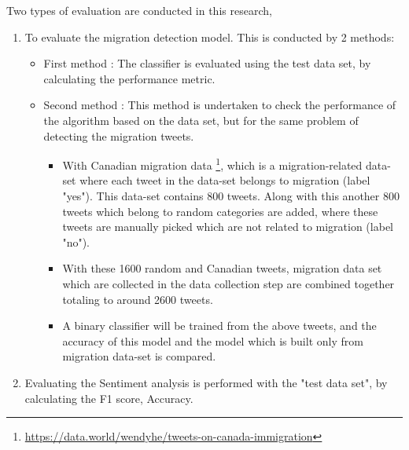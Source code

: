 Two types of evaluation are conducted in this research,
\begin{enumerate}
    \item To evaluate the migration detection model. This is conducted by 2 methods:
    \begin{itemize}
        \item First method : 
        The classifier is evaluated using the test data set, by calculating the performance metric.
        \item Second method :
         This method is undertaken to check the performance of the algorithm based on the data set, but for the same problem of detecting the migration tweets.
        \begin{itemize}
       
            \item With Canadian migration data \footnote{\url{https://data.world/wendyhe/tweets-on-canada-immigration}}, which is a migration-related data-set where each tweet in the data-set belongs to migration (label "yes"). This data-set contains 800 tweets. Along with this another 800 tweets which belong to random categories are added, where these tweets are manually picked which are not related to migration (label "no"). 
            \item With these 1600 random and Canadian tweets, migration data set which are collected in the data collection step are combined together totaling to around 2600 tweets.
            \item A binary classifier will be trained from the above tweets, and the accuracy of this model and the model which is built only from migration data-set is compared.
        \end{itemize}
        
    \end{itemize}


    \item Evaluating the Sentiment analysis is performed with the "test data set",
by calculating the F1 score, Accuracy.
\end{enumerate}